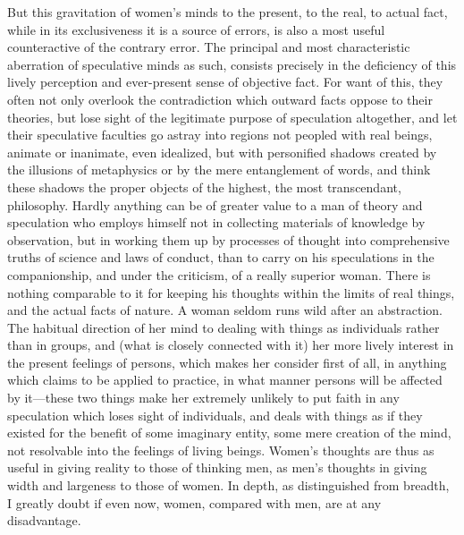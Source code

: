 \documentclass[12pt]{report}
\begin{document}
But this gravitation of women's minds to the present, to the real, to actual fact, while in its exclusiveness it is a source of errors, is also a most useful counteractive of the contrary error. The principal and most characteristic aberration of speculative minds as such, consists precisely in the deficiency of this lively perception and ever-present sense of objective fact. For want of this, they often not only overlook the contradiction which outward facts oppose to their theories, but lose sight of the legitimate purpose of speculation altogether, and let their speculative faculties go astray into regions not peopled with real beings, animate or inanimate, even idealized, but with personified shadows created by the illusions of metaphysics or by the mere entanglement of words, and think these shadows the proper objects of the highest, the most transcendant, philosophy. Hardly anything can be of greater value to a man of theory and speculation who employs himself not in collecting materials of knowledge by observation, but in working them up by processes of thought into comprehensive truths of science and laws of conduct, than to carry on his speculations in the companionship, and under the criticism, of a really superior woman. There is nothing comparable to it for keeping his thoughts within the limits of real things, and the actual facts of nature. A woman seldom runs wild after an abstraction. The habitual direction of her mind to dealing with things as individuals rather than in groups, and (what is closely connected with it) her more lively interest in the present feelings of persons, which makes her consider first of all, in anything which claims to be applied to practice, in what manner persons will be affected by it—these two things make her extremely unlikely to put faith in any speculation which loses sight of individuals, and deals with things as if they existed for the benefit of some imaginary entity, some mere creation of the mind, not resolvable into the feelings of living beings. Women's thoughts are thus as useful in giving reality to those of thinking men, as men's thoughts in giving width and largeness to those of women. In depth, as distinguished from breadth, I greatly doubt if even now, women, compared with men, are at any disadvantage.
\end{document}
